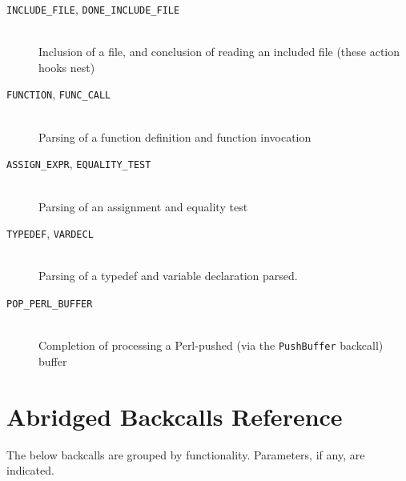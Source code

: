 \documentclass{article}
\newcommand{\Perl}{\mbox{Perl}}
\newcommand{\shook}[1]{\texttt{#1}}
\begin{document}
\begin{description}
\item[\shook{INCLUDE\_FILE}, \shook{DONE\_INCLUDE\_FILE}] ~ \\
  Inclusion of a file, and conclusion of reading an included file (these action hooks nest)

\item[\shook{FUNCTION}, \shook{FUNC\_CALL}] ~ \\
  Parsing of a function definition and function invocation

\item[\shook{ASSIGN\_EXPR}, \shook{EQUALITY\_TEST}] ~ \\
  Parsing of an assignment and equality test

\item[\shook{TYPEDEF}, \shook{VARDECL}] ~ \\
  Parsing of a typedef and variable declaration parsed.

\item[\shook{POP\_PERL\_BUFFER}] ~ \\
  Completion of processing a \Perl{}-pushed (via the \texttt{PushBuffer}
  backcall) buffer

\end{description}

\section{Abridged Backcalls Reference}
\label{sec:backcalls}

The below backcalls are grouped by functionality.  Parameters, if any,
are indicated.
\end{document}

